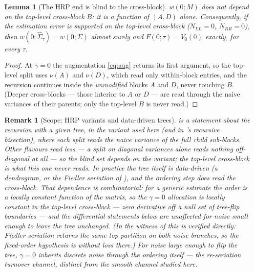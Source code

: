 \documentclass[11pt]{article}
\newtheorem{lemma}{Lemma}
\newtheorem{remark}{Remark}
\begin{document}
\begin{lemma}[The HRP end is blind to the cross-block]
\label{lem:blind}
$w(0; M)$ does not depend on the top-level cross-block $B$: it is a function
of $(A, D)$ alone. Consequently, if the estimation error is supported on the
top-level cross-block ($N_{LL} = 0$, $N_{RR} = 0$), then $w(0;
\widehat\Sigma_\tau) = w(0; \Sigma)$ almost surely and $F(0; \tau) = V_0(0)$
exactly, for every $\tau$.
\end{lemma}
\begin{proof}
At $\gamma = 0$ the augmentation \eqref{eq:aug} returns its first argument, so
the top-level split uses $\nu(A)$ and $\nu(D)$, which read only within-block
entries, and the recursion continues inside the \emph{unmodified} blocks $A$
and $D$, never touching $B$. (Deeper cross-blocks --- those interior to $A$ or
$D$ --- are read through the naive variances of their parents; only the
top-level $B$ is never read.)
\end{proof}

\begin{remark}[Scope: HRP variants and data-driven trees]
\label{rem:scope}
 is a statement about the recursion \emph{with a given tree},
in the variant used here (and in \textcite{lopezdeprado2016}'s recursive
bisection), where each split reads the naive variance of the full child
sub-blocks. Other flavours read less --- a split on diagonal variances alone
reads nothing off-diagonal at all --- so the blind set depends on the variant;
the top-level cross-block is what this one never reads. In practice the tree
itself is data-driven (a dendrogram, or the Fiedler seriation of
\textcite{cotton2024schur}), and the ordering step \emph{does} read the
cross-block. That dependence is combinatorial: for a generic estimate the
order is a locally constant function of the matrix, so the $\gamma = 0$
allocation is locally constant in the top-level cross-block --- zero
derivative off a null set of tree-flip boundaries --- and the differential
statements below are unaffected for noise small enough to leave the tree
unchanged. (In the witness of  this is verified directly:
Fiedler seriation returns the same top partition on both noise branches, so
the fixed-order hypothesis is without loss there.) For noise large enough to
flip the tree, $\gamma = 0$ inherits discrete noise through the ordering
itself --- the re-seriation turnover channel, distinct from the smooth channel
studied here.
\end{remark}
\end{document}
